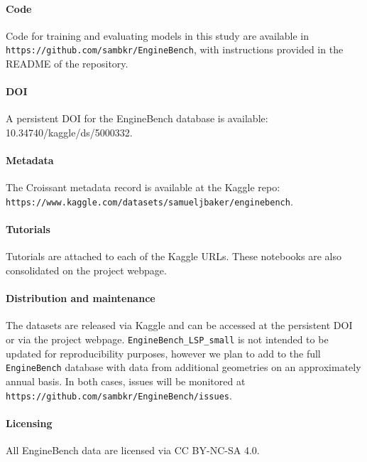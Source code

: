 \documentclass{article}
\begin{document}
\paragraph{Code} 
Code for training and evaluating models in this study are available in \texttt{https://github.com/sambkr/EngineBench}, with instructions provided in the README of the repository.
\paragraph{DOI}
A persistent DOI for the EngineBench database is available: 10.34740/kaggle/ds/5000332.
\paragraph{Metadata}
The Croissant metadata record is available at the Kaggle repo: \texttt{https://www.kaggle.com/datasets/samueljbaker/enginebench}.
\paragraph{Tutorials}
Tutorials are attached to each of the Kaggle URLs. These notebooks are also consolidated on the project webpage. 
\paragraph{Distribution and maintenance}
The datasets are released via Kaggle and can be accessed at the persistent DOI or via the project webpage. \texttt{EngineBench\_LSP\_small} is not intended to be updated for reproducibility purposes, however we plan to add to the full \texttt{EngineBench} database with data from additional geometries on an approximately annual basis. In both cases, issues will be monitored at \texttt{https://github.com/sambkr/EngineBench/issues}. 
\paragraph{Licensing}
All EngineBench data are licensed via CC BY-NC-SA 4.0.
\end{document}
